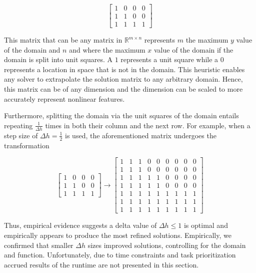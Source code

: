 \documentclass[10pt,a4paper]{article}
\begin{document}
\begin{displaymath}
\left[
\begin{matrix}
1 & 0 & 0 & 0 \\
1 & 1 & 0 & 0 \\
1 & 1 & 1 & 1 
\end{matrix}
\right]
\end{displaymath}

This matrix that can be any matrix in $ \mathbb{R}^{m \times n}$ represents $m$ the maximum $y$ value of the domain and $n$ and where the maximum $x$ value of the domain if the domain is split into unit squares. A $1$ represents a unit square while a $0$ represents a location in space that is not in the domain. This heuristic enables any solver to extrapolate the solution matrix to any arbitrary domain. Hence, this matrix can be of any dimension and the dimension can be scaled to more accurately represent nonlinear features.

 Furthermore, splitting the domain via the unit squares of the domain entails repeating $\frac{1}{\Delta h}$ times in both their column and the next row. For example, when a step size of $\Delta h = \frac{1}{2}$ is used, the aforementioned matrix undergoes the transformation

\begin{displaymath}
\left[
\begin{matrix}
1 & 0 & 0 & 0 \\
1 & 1 & 0 & 0 \\
1 & 1 & 1 & 1 
\end{matrix}
\right]
\to
\left[
\begin{matrix}
	1 & 1 & 1 & 0 & 0 & 0 & 0 & 0 & 0\\
	1 & 1 & 1 & 0 & 0 & 0 & 0 & 0 & 0\\
	1 & 1 & 1 & 1 & 1 & 0 & 0 & 0 & 0\\
	1 & 1 & 1 & 1 & 1 & 0 & 0 & 0 & 0\\
	1 & 1 & 1 & 1 & 1 & 1 & 1 & 1 & 1\\
	1 & 1 & 1 & 1 & 1 & 1 & 1 & 1 & 1\\
	1 & 1 & 1 & 1 & 1 & 1 & 1 & 1 & 1
\end{matrix}
\right]
\end{displaymath}

Thus, empirical evidence suggests a delta value of $\Delta h \leq 1$ is optimal and empirically appears to produce the most refined solutions. Empirically, we confirmed that smaller $\Delta h$ sizes improved solutions, controlling for the domain and function. Unfortunately, due to time constraints and task prioritization accrued results of the runtime are not presented in this section.  
\end{document}
